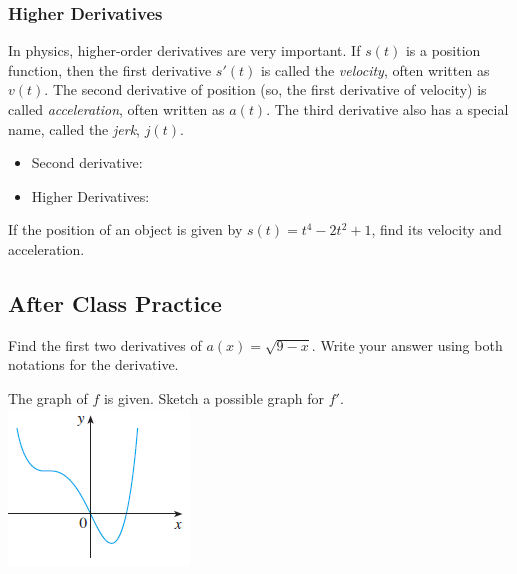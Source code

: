 \documentclass[notes]{subfiles}
\begin{document}
	\subsubsection*{Higher Derivatives}
		In physics, higher-order derivatives are very important.  If \(s(t)\) is a position function, then the first derivative \(s'(t)\) is called the \emph{velocity}, often written as \(v(t)\).  The second derivative of position (so, the first derivative of velocity) is called \emph{acceleration}, often written as \(a(t)\).  The third derivative also has a special name, called the \emph{jerk}, \(j(t)\).
		\begin{rmk}
				\begin{itemize}
				\setlength\itemsep{25pt}
					\item Second derivative: 
					\item Higher Derivatives: 
				\end{itemize}
			
		\end{rmk}
	
		\begin{ex}
			If the position of an object is given by \(s(t) = t^4 -2t^2 + 1\), find its velocity and acceleration.
		\end{ex}		
			\newpage
	
	\subsection*{After Class Practice}
		\begin{ex}
			Find the first two derivatives of $a(x) = \sqrt{9-x}$.  Write your answer using both notations for the derivative.
		\end{ex}	
			
		\begin{ex}
			The graph of $f$ is given.  Sketch a possible graph for $f'$.  \\
			\includegraphics[scale = 1.2]{3.2fig4}
		\end{ex}
\clearpage
\end{document}
